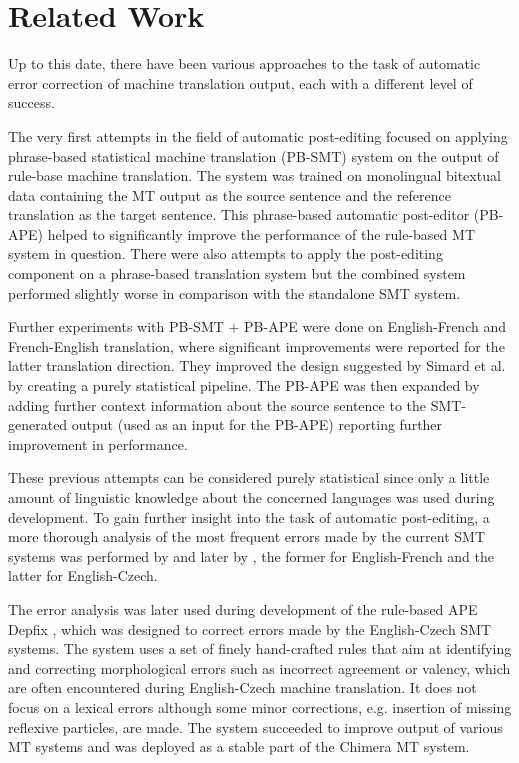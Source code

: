 \section{Related Work}

Up to this date, there have been various approaches to the task of automatic
error correction of machine translation output, each with a different level of success.

The very first attempts in the field of automatic post-editing \citep{simard2007rule}
focused on applying phrase-based statistical machine translation (PB-SMT)
system on the output of rule-base machine translation. The system was trained on monolingual
bitextual data containing the MT output as the source sentence and the reference translation as
the target sentence. This phrase-based automatic post-editor (PB-APE) helped to significantly improve
the performance of the rule-based MT system in question.
There were also attempts to apply the post-editing component
on a phrase-based translation system but the combined system performed slightly worse in comparison
with the standalone SMT system.

Further experiments with PB-SMT $+$ PB-APE \citep{bechara:2011} were done
on English-French and French-English translation, where significant improvements were reported
for the latter translation direction. They improved the design suggested by Simard et al. by
creating a purely statistical pipeline. The PB-APE was then expanded by adding further 
context information about the source sentence to the SMT-generated output (used as an input for
the PB-APE) reporting further improvement in performance.

These previous attempts can be considered purely statistical since only a little amount of linguistic
knowledge about the concerned languages was used during development. To gain further insight into
the task of automatic post-editing, a more thorough analysis of the most frequent errors made by the current
SMT systems was performed by \citet{bechara:master} and later by \citet{biblio:RoAutomaticpostediting2013}, the former
for English-French and the latter for English-Czech.

The error analysis was later used during development of the rule-based APE Depfix \citep{depfix:2014},
which was designed to correct errors made by the English-Czech SMT systems.
The system uses a set of finely hand-crafted rules that aim at identifying
and correcting morphological errors such as incorrect agreement or valency, which are
often encountered during English-Czech machine translation. It does not focus on a lexical errors
although some minor corrections, e.g. insertion of missing reflexive particles, are made. The system
succeeded to improve output of various MT systems and was deployed as a stable part of the
Chimera \citep{bojar-rosa-tamchyna:2013:WMT} MT system.

